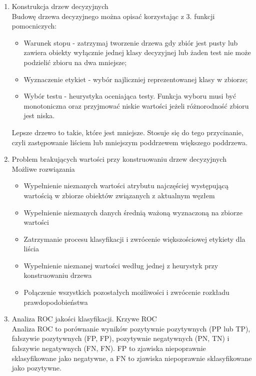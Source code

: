 \documentclass[11pt]{article}
\begin{document}
\begin{enumerate}
        \item Konstrukcja drzew decyzyjnych \\
        Budowę drzewa decyzyjnego można opisać korzystając z 3. funkcji pomocniczych:
        \begin{itemize}
        	\item Warunek stopu - zatrzymaj tworzenie drzewa gdy zbiór jest pusty lub
        	zawiera obiekty wyłącznie jednej klasy decyzyjnej lub żaden test nie może
        	podzielić zbioru na dwa mniejsze;
        	\item Wyznaczenie etykiet - wybór najliczniej reprezentowanej klasy w zbiorze;
        	\item Wybór testu - heurystyka oceniająca testy. Funkcja wyboru musi być
        	monotoniczna oraz przyjmować niskie wartości jeżeli różnorodność zbioru jest
        	niska.
        \end{itemize}
        Lepsze drzewo to takie, które jest mniejsze. Stosuje się do tego przycinanie,
        czyli zastępowanie liściem lub mniejszym poddrzewem większego poddrzewa.
        
        \item Problem brakujących wartości przy konstruowaniu drzew decyzyjnych \\
        Możliwe rozwiązania
        \begin{itemize}
        	\item Wypełnienie nieznanych wartości atrybutu najczęściej
        	występującą wartością w zbiorze obiektów związanych z
        	aktualnym węzłem
        	\item Wypełnienie nieznanych danych średnią ważoną wyznaczoną na
        	zbiorze wartości
        	\item Zatrzymanie procesu klasyfikacji i zwrócenie większościowej etykiety
        	dla liścia
        	\item Wypełnienie nieznanej wartości według jednej z heurystyk przy
        	konstruowaniu drzewa
        	\item Połączenie wszystkich pozostałych możliwości i zwrócenie rozkładu
        	prawdopodobieństwa
        \end{itemize}
        \item Analiza ROC jakości klasyfikacji. Krzywe ROC \\
        Analiza ROC to porównanie wyników pozytywnie pozytywnych (PP lub TP),
        fałszywie pozytywnych (FP, FP), pozytywnie negatywnych (PN, TN) i fałszywie
        negatywnych (FN, FN). FP to zjawiska niepoprawnie sklasyfikowane jako negatywne,
        a FN to zjawiska niepoprawnie sklasyfikowane jako pozytywne.
        

\end{enumerate}
\end{document}
